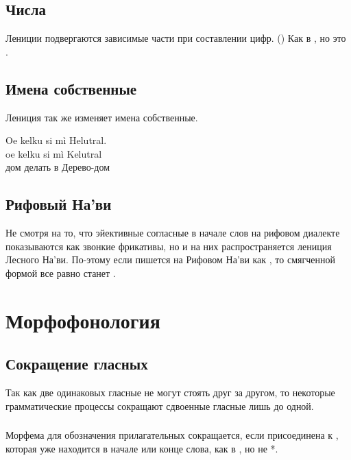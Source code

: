 \subsection{Числа}
Лениции подвергаются зависимые части при составлении цифр.
() Как в  ,
но  это .

\subsection{Имена собственные} Лениция так же изменяет имена собственные.

\begin{interlin} \label{lenition:ex01}
\glll Oe kelku si mì Helutral. \\
      oe kelku si mì Kelutral \\
      дом делать в Дерево-дом \\
\end{interlin}


\subsection{Рифовый На'ви} 
Не смотря на то, что эйективные согласные в начале слов на рифовом диалекте показываются как звонкие фрикативы, но и на них распространяется лениция Лесного На'ви. По-этому если   пишется на Рифовом На'ви как , то смягченной формой все равно станет .

\section{Морфофонология}

\subsection{Сокращение гласных} Так как две одинаковых гласные не могут стоять друг за другом, то некоторые грамматические процессы сокращают сдвоенные гласные лишь до одной.\label{l-and-s:contract}

\subsubsection{} Морфема для обозначения прилагательных  сокращается, если присоединена к , которая уже находится в начале или конце слова, как в
, но не *.

